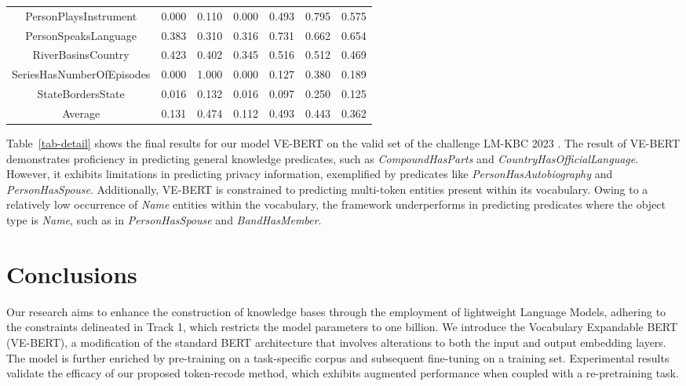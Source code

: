 \documentclass[]{ceurart}
\begin{document}
\begin{table}[h!]
\begin{tabular}{|c|c|c|c|c|c|c|}
PersonPlaysInstrument        &  0.000& 0.110 & 0.000  &      0.493  &  0.795  &  0.575    \\ 
PersonSpeaksLanguage         &  0.383& 0.310 & 0.316  &      0.731  &  0.662  &  0.654    \\  
RiverBasinsCountry           &  0.423& 0.402 & 0.345  &      0.516  &  0.512  &  0.469    \\  
SeriesHasNumberOfEpisodes    &  0.000& 1.000 & 0.000  &      0.127  &  0.380  &  0.189    \\  
StateBordersState            &  0.016& 0.132 & 0.016  &      0.097  &  0.250  &  0.125    \\  
\hline
Average                      &  0.131& 0.474 & 0.112  &      0.493  &  0.443  &  0.362    \\  

 
\hline
    \end{tabular}
    \label{tab:final_experiment}
\end{table}

Table~\ref{tab-detail} shows the final results for our model VE-BERT on the  valid set of the challenge LM-KBC 2023 \cite{singhania_lm-kbc_2023}.
The result of VE-BERT demonstrates proficiency in predicting general knowledge predicates, such as \textit{CompoundHasParts} and \textit{CountryHasOfficialLanguage}. However, it exhibits limitations in predicting privacy information, exemplified by predicates like \textit{PersonHasAutobiography} and \textit{PersonHasSpouse}. Additionally, VE-BERT is constrained to predicting multi-token entities present within its vocabulary. Owing to a relatively low occurrence of \textit{Name} entities within the vocabulary, the framework underperforms in predicting predicates where the object type is \textit{Name}, such as in \textit{PersonHasSpouse} and \textit{BandHasMember}.

\section{Conclusions}

Our research aims to enhance the construction of knowledge bases through the employment of lightweight Language Models, adhering to the constraints delineated in Track 1, which restricts the model parameters to one billion. We introduce the Vocabulary Expandable BERT (VE-BERT), a modification of the standard BERT architecture that involves alterations to both the input and output embedding layers. The model is further enriched by pre-training on a task-specific corpus and subsequent fine-tuning on a training set. Experimental results validate the efficacy of our proposed token-recode method, which exhibits augmented performance when coupled with a re-pretraining task.
\end{document}
